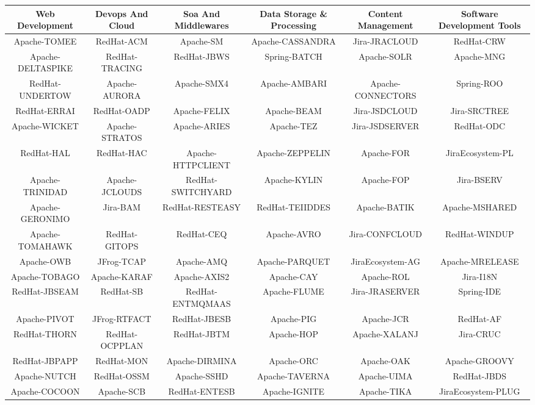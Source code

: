 \begin{tabular}{|c|c|c|c|c|c|}
\hline
Web Development & Devops And Cloud & Soa And Middlewares & Data Storage \& Processing & Content Management & Software Development Tools\\
\hline\hline
Apache-TOMEE & RedHat-ACM & Apache-SM & Apache-CASSANDRA & Jira-JRACLOUD & RedHat-CRW\\
\hline
Apache-DELTASPIKE & RedHat-TRACING & RedHat-JBWS & Spring-BATCH & Apache-SOLR & Apache-MNG\\
\hline
RedHat-UNDERTOW & Apache-AURORA & Apache-SMX4 & Apache-AMBARI & Apache-CONNECTORS & Spring-ROO\\
\hline
RedHat-ERRAI & RedHat-OADP & Apache-FELIX & Apache-BEAM & Jira-JSDCLOUD & Jira-SRCTREE\\
\hline
Apache-WICKET & Apache-STRATOS & Apache-ARIES & Apache-TEZ & Jira-JSDSERVER & RedHat-ODC\\
\hline
RedHat-HAL & RedHat-HAC & Apache-HTTPCLIENT & Apache-ZEPPELIN & Apache-FOR & JiraEcosystem-PL\\
\hline
Apache-TRINIDAD & Apache-JCLOUDS & RedHat-SWITCHYARD & Apache-KYLIN & Apache-FOP & Jira-BSERV\\
\hline
Apache-GERONIMO & Jira-BAM & RedHat-RESTEASY & RedHat-TEIIDDES & Apache-BATIK & Apache-MSHARED\\
\hline
Apache-TOMAHAWK & RedHat-GITOPS & RedHat-CEQ & Apache-AVRO & Jira-CONFCLOUD & RedHat-WINDUP\\
\hline
Apache-OWB & JFrog-TCAP & Apache-AMQ & Apache-PARQUET & JiraEcosystem-AG & Apache-MRELEASE\\
\hline
Apache-TOBAGO & Apache-KARAF & Apache-AXIS2 & Apache-CAY & Apache-ROL & Jira-I18N\\
\hline
RedHat-JBSEAM & RedHat-SB & RedHat-ENTMQMAAS & Apache-FLUME & Jira-JRASERVER & Spring-IDE\\
\hline
Apache-PIVOT & JFrog-RTFACT & RedHat-JBESB & Apache-PIG & Apache-JCR & RedHat-AF\\
\hline
RedHat-THORN & RedHat-OCPPLAN & RedHat-JBTM & Apache-HOP & Apache-XALANJ & Jira-CRUC\\
\hline
RedHat-JBPAPP & RedHat-MON & Apache-DIRMINA & Apache-ORC & Apache-OAK & Apache-GROOVY\\
\hline
Apache-NUTCH & RedHat-OSSM & Apache-SSHD & Apache-TAVERNA & Apache-UIMA & RedHat-JBDS\\
\hline
Apache-COCOON & Apache-SCB & RedHat-ENTESB & Apache-IGNITE & Apache-TIKA & JiraEcosystem-PLUG\\

\end{tabular}
